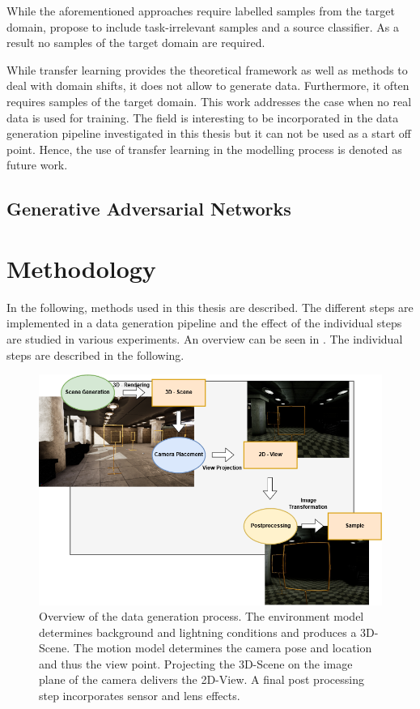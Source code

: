 While the aforementioned approaches require labelled samples from the target domain, \citeauthor{Peng2017} \cite{Peng2017} propose to include task-irrelevant samples and a source classifier. As a result no samples of the target domain are required.

While transfer learning provides the theoretical framework as well as methods to deal with domain shifts, it does not allow to generate data. Furthermore, it often requires samples of the target domain. This work addresses the case when no real data is used for training. The field is interesting to be incorporated in the data generation pipeline investigated in this thesis but it can not be used as a start off point. Hence, the use of transfer learning in the modelling process is denoted as future work.

\subsection{Generative Adversarial Networks}

\cite{Inoue} 

\section{Methodology}
\label{sec:training:meth}

In the following, methods used in this thesis are described. The different steps are implemented in a data generation pipeline and the effect of the individual steps are studied in various experiments. An overview can be seen in . The individual steps are described in the following.

\begin{figure}[htbp]
	\centering
	\includegraphics[width=\textwidth]{fig/Toolchain_datagen}
	\caption{Overview of the data generation process. The environment model determines background and lightning conditions and produces a 3D-Scene. The motion model determines the camera pose and location and thus the view point. Projecting the 3D-Scene on the image plane of the camera delivers the 2D-View. A final post processing step incorporates sensor and lens effects.}
	\label{fig:training:toolchain_datagen}
\end{figure}


